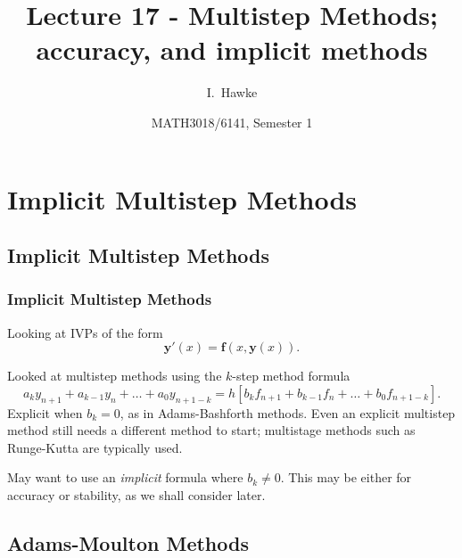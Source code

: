 \documentclass{beamer}
\title[Lecture 17] %
{Lecture 17 - Multistep Methods; accuracy, and implicit methods}
\author[I. Hawke] %
{I.~Hawke}
\institute[University of Southampton] %
{
  School of Mathematics, \\
  University of Southampton, UK
}
\date[Semester 1] %
{MATH3018/6141, Semester 1}
\newcommand{\by}{{\boldsymbol{y}}}
\newcommand{\bfm}[1]{{\boldsymbol{#1}}}
\begin{document}
\begin{frame}
  \titlepage
\end{frame}

\section{Implicit Multistep Methods}

\subsection{Implicit Multistep Methods}

\begin{frame}
  \frametitle{Implicit Multistep Methods}

  Looking at IVPs of the form
  \begin{equation*}
    \by'(x) = \bfm{f}(x, \by(x)).
  \end{equation*}

  Looked at multistep methods using the $k$-step method formula
  \begin{equation*}
    a_k y_{n+1} + a_{k-1} y_n + \dots + a_0 y_{n+1-k} = h \left[ b_k
      f_{n+1} + b_{k-1} f_n + \dots + b_0 f_{n+1-k} \right].
  \end{equation*}
  Explicit when $b_k = 0$, as in Adams-Bashforth methods.  \pause Even
  an explicit multistep method still needs a different method to
  start; multistage methods such as Runge-Kutta are typically
  used. \pause

  \vspace{1ex}

  May want to use an \emph{implicit} formula where $b_k \neq 0$. This
  may be either for accuracy or stability, as we shall consider later.

\end{frame}


\subsection{Adams-Moulton Methods}
\end{document}
